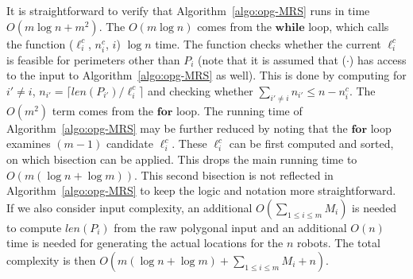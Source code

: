 It is straightforward to verify that Algorithm~\ref{algo:opg-MRS} runs in 
time $O(m\log n + m^2)$. The $O(m\log n)$ comes from the $\mathbf{while}$ 
loop, which calls the function \isLFeasible($\ell_i^c$, $n_i^c$, $i$) 
$\log n$ time. The function checks whether the current $\ell_i^c$ is 
feasible for perimeters other than $P_i$ (note that it is assumed that 
\isLFeasible($\cdot$) has access to the input to Algorithm~\ref{algo:opg-MRS} 
as well). This is done by computing for $i' \ne i$, $n_{i'} = \lceil 
len(P_{i'})/\ell_i^c \rceil$ and checking whether $\sum_{{i'} \ne i}n_{i'} 
\le n - n_i^c$. The $O(m^2)$ term comes from the $\mathbf{for}$ loop. 
The running time of Algorithm~\ref{algo:opg-MRS} may be further reduced by 
noting that the $\mathbf{for}$ loop examines $(m-1)$ candidate 
$\ell_i^c$. These $\ell_i^c$ can be first computed and sorted, on which 
bisection can be applied. This drops the main running time to 
$O(m(\log n + \log m))$. This second bisection is not reflected in 
Algorithm~\ref{algo:opg-MRS} to keep the logic and notation more 
straightforward. If we also consider input complexity, an additional 
$O(\sum_{1\le i \le m} M_i)$ is needed to compute $len(P_i)$ from the raw polygonal 
input and an additional $O(n)$ time is needed for generating the actual
locations for the $n$ robots. The total complexity is then $O(m(\log n + 
\log m) + \sum_{1\le i \le m} M_i + n)$.


